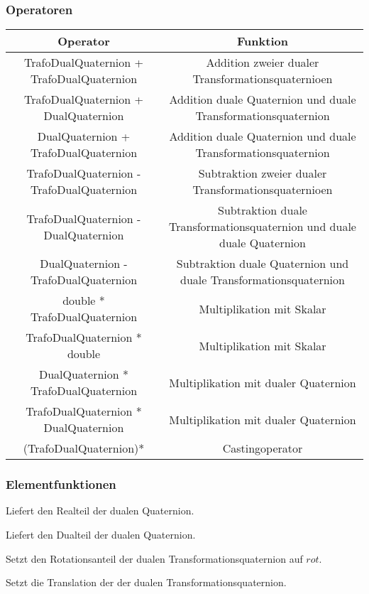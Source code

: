 \subsubsection{Operatoren}
\begin{tabular}{|c|c|}
\hline
Operator & Funktion\\ 
\hline
TrafoDualQuaternion + TrafoDualQuaternion & Addition zweier dualer
Transformationsquaternioen\\
\hline
TrafoDualQuaternion + DualQuaternion & Addition duale Quaternion und duale
Transformationsquaternion\\
\hline
DualQuaternion + TrafoDualQuaternion & Addition duale Quaternion und duale
Transformationsquaternion\\
\hline
TrafoDualQuaternion - TrafoDualQuaternion & Subtraktion zweier dualer
Transformationsquaternioen\\
\hline
TrafoDualQuaternion - DualQuaternion & Subtraktion duale Transformationsquaternion und
duale duale Quaternion\\
\hline
DualQuaternion - TrafoDualQuaternion & Subtraktion duale Quaternion und duale
Transformationsquaternion\\
\hline
double * TrafoDualQuaternion & Multiplikation mit Skalar\\
\hline
TrafoDualQuaternion * double & Multiplikation mit Skalar\\
\hline
DualQuaternion * TrafoDualQuaternion & Multiplikation mit dualer Quaternion\\
\hline
TrafoDualQuaternion * DualQuaternion & Multiplikation mit dualer Quaternion\\
\hline
(TrafoDualQuaternion)* & Castingoperator\\
\hline
\end{tabular}

\subsubsection{Elementfunktionen}
\descr
{
Liefert den Realteil der dualen Quaternion.
}

\descr
{
Liefert den Dualteil der dualen Quaternion.
}

\descr
{
Setzt den Rotationsanteil der dualen Transformationsquaternion auf $rot$.
}

\descr
{
Setzt die Translation der der dualen Transformationsquaternion.
}

